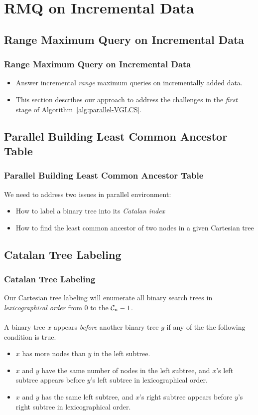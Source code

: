 \section{RMQ on Incremental Data}

\subsection{Range Maximum Query on Incremental Data}
\begin{frame}
    \frametitle{Range Maximum Query on Incremental Data}
    \begin{itemize}
    	\setlength\itemsep{1em}
    	\item
    		Answer incremental {\em range} maximum queries on
			incrementally added data.
    	\item
    		This section describes our approach to address the
			challenges in the {\em first} stage of
			Algorithm~\ref{alg:parallel-VGLCS}.
    \end{itemize}
\end{frame}

\subsection{Parallel Building Least Common Ancestor Table}
\begin{frame}
    \frametitle{Parallel Building Least Common Ancestor Table}
    We need to address two issues in parallel environment:
    \begin{itemize}
    	\setlength\itemsep{1em}
    	\item 
    		How to label a binary tree into its {\em Catalan index}
		\item 
			How to find the least common ancestor of two nodes in a
			given Cartesian tree
	\end{itemize}
\end{frame}

\subsection{Catalan Tree Labeling}
\begin{frame}
    \frametitle{Catalan Tree Labeling}
    Our Cartesian tree labeling will enumerate all binary search trees
	in {\em lexicographical order} from $0$ to the ${\cal C}_n-1$.
	\\~\\
	A binary tree $x$ appears {\em before} another binary tree $y$ if
	any of the the following condition is true.
	\begin{itemize}
		\setlength\itemsep{1em}
		\item 
			$x$ has more nodes than $y$ in the left subtree.
		\item 
			$x$ and $y$ have the same number of nodes in the left
  			subtree, and $x$'s left subtree appears before $y$'s left
  			subtree in lexicographical order.
		\item 
			$x$ and $y$ has the same left subtree, and $x$'s right
	  		subtree appears before $y$'s right subtree in
	  		lexicographical order.
	\end{itemize}
\end{frame}

